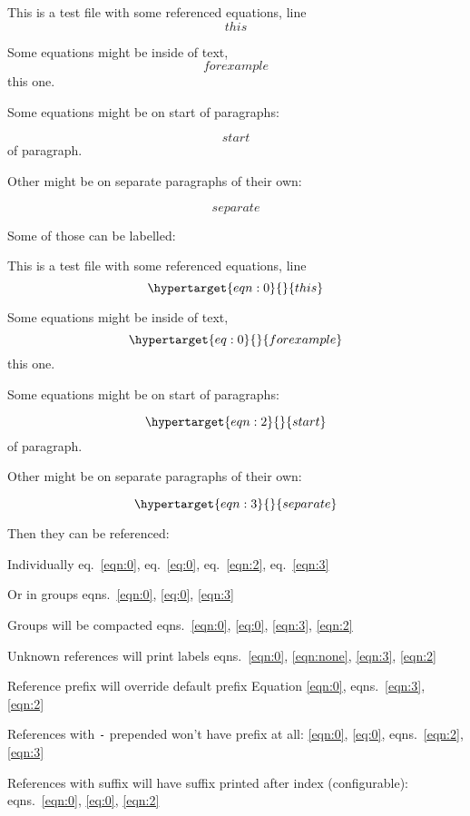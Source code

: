 This is a test file with some referenced equations, line \[ this \]

Some equations might be inside of text, \[ for example \] this one.

Some equations might be on start of paragraphs:

\[ start \] of paragraph.

Other might be on separate paragraphs of their own:

\[ separate \]

Some of those can be labelled:

This is a test file with some referenced equations, line
\begin{equation}\protect\hypertarget{eqn:0}{}{ this }\label{eqn:0}\end{equation}

Some equations might be inside of text,
\begin{equation}\protect\hypertarget{eq:0}{}{ for example }\label{eq:0}\end{equation}
this one.

Some equations might be on start of paragraphs:

\begin{equation}\protect\hypertarget{eqn:2}{}{ start }\label{eqn:2}\end{equation}
of paragraph.

Other might be on separate paragraphs of their own:

\begin{equation}\protect\hypertarget{eqn:3}{}{ separate }\label{eqn:3}\end{equation}

Then they can be referenced:

Individually eq.~\ref{eqn:0}, eq.~\ref{eq:0}, eq.~\ref{eqn:2},
eq.~\ref{eqn:3}

Or in groups eqns.~\ref{eqn:0}, \ref{eq:0}, \ref{eqn:3}

Groups will be compacted
eqns.~\ref{eqn:0}, \ref{eq:0}, \ref{eqn:3}, \ref{eqn:2}

Unknown references will print labels
eqns.~\ref{eqn:0}, \ref{eqn:none}, \ref{eqn:3}, \ref{eqn:2}

Reference prefix will override default prefix Equation \ref{eqn:0},
eqns.~\ref{eqn:3}, \ref{eqn:2}

References with \texttt{-} prepended won't have prefix at all:
\ref{eqn:0}, \ref{eq:0}, eqns.~\ref{eqn:2}, \ref{eqn:3}

References with suffix will have suffix printed after index
(configurable): eqns.~\ref{eqn:0}, \ref{eq:0}, \ref{eqn:2}
